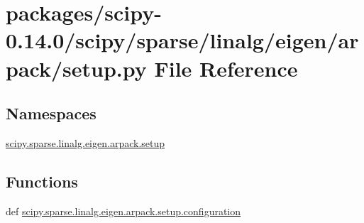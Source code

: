 \hypertarget{packages_2scipy-0_814_80_2scipy_2sparse_2linalg_2eigen_2arpack_2setup_8py}{}\section{packages/scipy-\/0.14.0/scipy/sparse/linalg/eigen/arpack/setup.py File Reference}
\label{packages_2scipy-0_814_80_2scipy_2sparse_2linalg_2eigen_2arpack_2setup_8py}
\subsection*{Namespaces}
\begin{DoxyCompactItemize}
\item 
 \hyperlink{namespacescipy_1_1sparse_1_1linalg_1_1eigen_1_1arpack_1_1setup}{scipy.\+sparse.\+linalg.\+eigen.\+arpack.\+setup}
\end{DoxyCompactItemize}
\subsection*{Functions}
\begin{DoxyCompactItemize}
\item 
def \hyperlink{namespacescipy_1_1sparse_1_1linalg_1_1eigen_1_1arpack_1_1setup_a0c9f76f5828bcc9f947bae4e66dbca58}{scipy.\+sparse.\+linalg.\+eigen.\+arpack.\+setup.\+configuration}
\end{DoxyCompactItemize}
